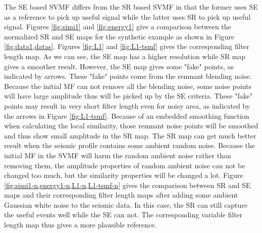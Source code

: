 The SE based SVMF differs from the SR based SVMF in that the former uses SE as a reference to pick up useful signal while the latter uses SR to pick up useful signal. Figures \ref{fig:simi1} and \ref{fig:energy1} give a comparison between the normalized SR and SE maps for the synthetic example as shown in Figure \ref{fig:data1,datas}. %
Figures \ref{fig:L1} and \ref{fig:L1-tsmf} gives the corresponding filter length map. As we can see, the SE map has a higher resolution while SR map gives a smoother result. However, the SE map gives some "fake" points, as indicated by arrows. These "fake" points come from the remnant blending noise. Because the initial MF can not remove all the blending noise, some noise points will have large amplitude thus will be picked up by the SE criteria. These "fake" points may result in very short filter length even for noisy area, as indicated by the arrows in Figure \ref{fig:L1-tsmf}. Because of an embedded smoothing function when calculating the local similarity, those remnant noise points will be smoothed and thus show small amplitude in the SR map. The SR map can get much better result when the seismic profile contains some ambient random noise. Because the initial MF in the SVMF will harm the random ambient noise rather than removing them, the amplitude properties of random ambient noise can not be changed too much, but the similarity properties will be changed a lot. Figure \ref{fig:simi1-n,energy1-n,L1-n,L1-tsmf-n} gives the comparison between SR and SE maps and their corresponding filter length maps after adding some ambient Gaussian white noise to the seismic data. In this case, the SR can still capture the useful events well while the SE can not. The corresponding variable filter length map thus gives a more plausible reference. 



